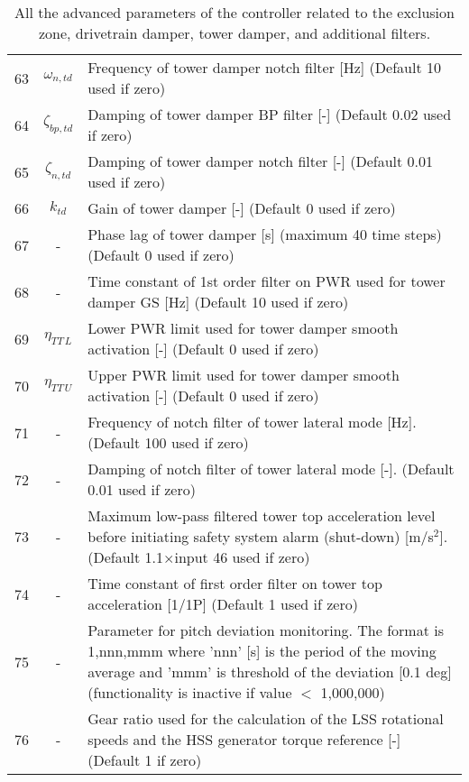 \begin{table}[t!]
\begin{center}
\begin{tabular}{r|c|p{11.5cm}}
 63  & $\omega_{n, td}$	& Frequency of tower damper notch filter [Hz]                  (Default 10 used if zero)\\ 
 64  & $\zeta_{bp,td}$	& Damping of tower damper  BP filter [-]                       (Default 0.02 used if zero)\\ 
 65  & $\zeta_{n,td}$	  & Damping of tower damper  notch filter [-]                    (Default 0.01 used if zero)\\ 
 66  & $k_{td}$ 		& Gain of tower damper  [-]                                        (Default 0 used if zero)\\ 
 67  & - 			& Phase lag of tower damper  [s] (maximum 40 time steps)                 (Default 0 used if zero)\\ 
 68  & - 			& Time constant of 1st order filter on PWR used for tower damper GS [Hz] (Default 10 used if zero)\\ 
 69  & $\eta_{TT\,L}$ 	& Lower PWR limit used for tower damper smooth activation [-]  (Default 0 used if zero)\\ 
 70  & $\eta_{TT\,U}$  	& Upper PWR limit used for tower damper smooth activation [-]  (Default 0 used if zero) \\ 
\hline
 71  & - 			& Frequency of notch filter of tower lateral mode [Hz]. (Default 100 used if zero)\\ 
 72  & - 			& Damping of notch filter of tower lateral mode [-].    (Default 0.01 used if zero)\\ 
\hline
 73  & - 			& Maximum low-pass filtered tower top acceleration level before initiating safety system alarm (shut-down) [m/s${}^2$]. (Default 1.1$\times$input 46 used if zero) \\ 
 74  & - 			& Time constant of first order filter on tower top acceleration [1/1P] (Default 1 used if zero)\\ 
\hline
 75  & - 			& Parameter for pitch deviation monitoring. The format is 1,nnn,mmm where 'nnn' [s] is the period of the moving average and 'mmm' is threshold of the deviation [0.1 deg] (functionality is inactive if value $<$ 1,000,000) \\ 
 \hline
 76  &- 			& Gear ratio used for the calculation of the LSS rotational speeds and the HSS generator torque reference [-] (Default 1 if zero)\\
\end{tabular}
\caption{All the advanced parameters of the controller related to the exclusion zone, drivetrain damper, tower damper, and additional filters. \label{t:par2}}
\end{center}
\end{table}


